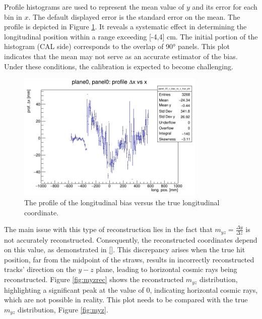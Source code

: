 Profile histograms are used to represent the mean value of $y$ and its error for each bin in $x$. 
The default displayed error is the standard error on the mean. 
The profile is depicted in Figure \ref{fig:profile}. It reveals a systematic effect in determining the 
longitudinal position within a range exceeding [-4,4] cm. The initial portion of the histogram (CAL side) 
corresponds to the overlap of 90° panels. This plot indicates that the mean may not serve as an accurate estimator of the bias. 
Under these conditions, the calibration is expected to become challenging.
\begin{figure}[!h]
    \centering
    \includegraphics[width=0.8\textwidth]{figures/png/panel_00_x_bias_vs_x_prof.png}
    \caption{The profile of the longitudinal bias versus the true longitudinal coordinate.}
    \label{fig:profile}
\end{figure}
The main issue with this type of reconstruction lies in the fact that $m_{yz}=\frac{\Delta y}{\Delta z}$ 
is not accurately reconstructed. Consequently, the reconstructed coordinates depend on this value, as demonstrated in \ref{}. 
This discrepancy arises when the true hit position, far from the midpoint of the straws, results in incorrectly reconstructed tracks'
direction on the $y-z$ plane, leading to horizontal cosmic rays being reconstructed. 
Figure \ref{fig:myzrec} shows the reconstructed $m_{yz}$ distribution, highlighting a significant peak at the value of 0, 
indicating horizontal cosmic rays, which are not possible in reality. This plot needs to be compared with the true $m_{yz}$ distribution, Figure \ref{fig:myz}.



